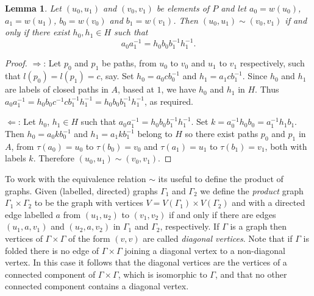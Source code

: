 \documentclass[a4paper,12pt]{article}
\newcommand{\G}{\Gamma }
\renewcommand{\t}{\tau }
\newtheorem{lemma}[theorem]{Lemma}
\numberwithin{equation}{section}
\numberwithin{figure}{section}
\begin{document}
\begin{lemma}\label{lem:equiv_verts}
Let $(u_0,u_1)$ and $(v_0,v_1)$ be elements of $P$ and let
$a_0=w(u_0)$, $a_1=w(u_1)$, $b_0=w(v_0)$ and $b_1=w(v_1)$. Then
$(u_0,u_1)\sim (v_0,v_1)$ if and only if there exist $h_0,h_1\in H$ such that
\[a_0a_1^{-1}=h_0b_0b_1^{-1}h_1^{-1}.\]
\end{lemma}
\begin{proof}
$\Rightarrow$: Let $p_0$ and $p_1$ be paths, from $u_0$ to $v_0$ and $u_1$ to $v_1$
respectively, such that $l(p_0)=l(p_1)=c$, say. Set $h_0=a_0cb_0^{-1}$ and
$h_1=a_1cb_1^{-1}$. Since $h_0$ and $h_1$ are labels of closed paths in $A$, based at $1$, we
have $h_0$ and $h_1$ in $H$. Thus
$a_0a_1^{-1}=h_0b_0c^{-1}cb_1^{-1}h_1^{-1}=h_0b_0b_1^{-1}h_1^{-1}$, as required.

$\Leftarrow$: Let $h_0$, $h_1 \in H$ such that $a_0a_1^{-1}=h_0b_0b_1^{-1}h_1^{-1}$.
Set $k=a_0^{-1}h_0b_0=a_1^{-1}h_1b_1$. Then $h_0=a_0kb_0^{-1}$ and $h_1=a_1kb_1^{-1}$
belong to $H$ so there exist paths $p_0$ and $p_1$ in $A$,
from $\t(a_0)=u_0$ to $\t(b_0)=v_0$ and
$\t(a_1)=u_1$ to $\t(b_1)=v_1$, both with labels $k$.
Therefore $(u_0,u_1)\sim (v_0,v_1)$.
\end{proof}


To work with the equivalence relation $\sim$ its useful to define
the product of graphs. Given (labelled, directed)
graphs $\G_1$ and $\G_2$ we define the {\em
product} graph $\G_1\times \G_2$ to be the graph with vertices
$V=V(\G_1)\times V(\G_2)$ and with a directed edge labelled $a$
from $(u_1,u_2)$ to $(v_1,v_2)$ if and only if there are edges
$(u_1,a, v_1)$ and $(u_2,a,v_2)$ in $\G_1$ and $\G_2$,
respectively. If $\G$ is a graph then
vertices of $\G\times \G$ of
 the form $(v,v)$ are called {\em diagonal vertices}.
Note that if $\G$ is folded there is no edge of $\G\times \G$
joining a diagonal vertex to a non-diagonal vertex. In this case
it follows that the diagonal vertices are the vertices of a
connected component of $\G\times \G$, which is isomorphic to $\G$,
and that no other connected component contains a diagonal vertex.
\end{document}
